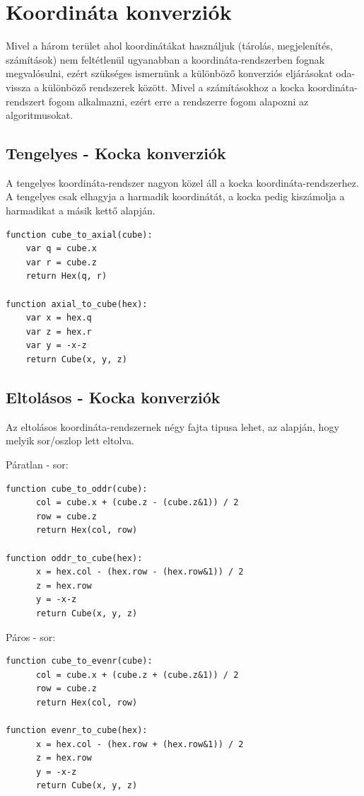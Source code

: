 \section{Koordináta konverziók}

Mivel a három terület ahol koordinátákat használjuk (tárolás, megjelenítés, számítások) nem feltétlenül ugyanabban a koordináta-rendszerben fognak megvalósulni, ezért szükséges ismernünk a különböző konverziós eljárásokat oda-vissza a különböző rendszerek között. Mivel a számításokhoz a kocka koordináta-rendszert fogom alkalmazni, ezért erre a rendszerre fogom alapozni az algoritmusokat.

\subsection{Tengelyes - Kocka konverziók}

A tengelyes koordináta-rendszer nagyon közel áll a kocka koordináta-rendszerhez. A tengelyes csak elhagyja a harmadik koordinátát, a kocka pedig kiszámolja a harmadikat a másik kettő alapján.

\begin{verbatim}
function cube_to_axial(cube):
    var q = cube.x
    var r = cube.z
    return Hex(q, r)

function axial_to_cube(hex):
    var x = hex.q
    var z = hex.r
    var y = -x-z
    return Cube(x, y, z)
\end{verbatim}

\subsection{Eltolásos - Kocka konverziók}

Az eltolásos koordináta-rendszernek négy fajta tipusa lehet, az alapján, hogy melyik sor/oszlop lett eltolva.

Páratlan - sor:
\begin{verbatim}
function cube_to_oddr(cube):
      col = cube.x + (cube.z - (cube.z&1)) / 2
      row = cube.z
      return Hex(col, row)

function oddr_to_cube(hex):
      x = hex.col - (hex.row - (hex.row&1)) / 2
      z = hex.row
      y = -x-z
      return Cube(x, y, z)
\end{verbatim}

Páros - sor:
\begin{verbatim}
function cube_to_evenr(cube):
      col = cube.x + (cube.z + (cube.z&1)) / 2
      row = cube.z
      return Hex(col, row)

function evenr_to_cube(hex):
      x = hex.col - (hex.row + (hex.row&1)) / 2
      z = hex.row
      y = -x-z
      return Cube(x, y, z)
\end{verbatim}

